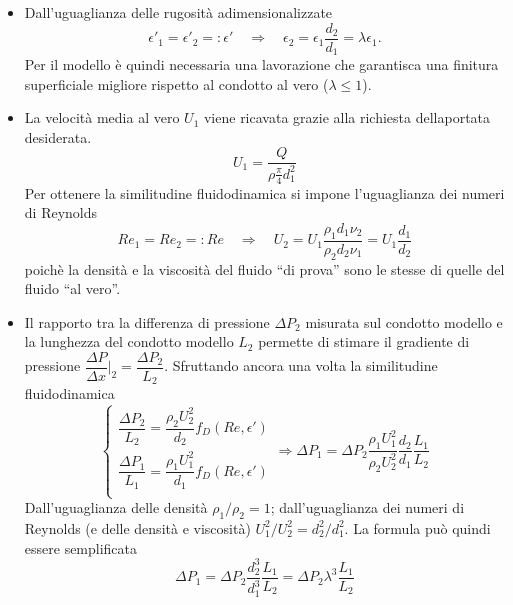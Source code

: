  \begin{itemize}
  \item Dall'uguaglianza delle rugosità adimensionalizzate
    \begin{equation}
      \epsilon'_1 = \epsilon'_2=:\epsilon' \quad \Rightarrow \quad \epsilon_2 = \epsilon_1 \dfrac{d_2}{d_1} = \lambda \epsilon_1.
    \end{equation}
    Per il modello è quindi necessaria una lavorazione che garantisca una
     finitura superficiale migliore rispetto al condotto al vero
     ($\lambda \le 1$).
  \item La velocità media al vero $U_1$ viene ricavata grazie alla richiesta
   dellaportata desiderata.
     \begin{equation}
       U_1 = \dfrac{Q}{\rho \frac{\pi}{4} d_1^2}
     \end{equation}
     Per ottenere la similitudine fluidodinamica si impone l'uguaglianza
     dei numeri di Reynolds
     \begin{equation}
      Re_1 = Re_2=:Re \quad \Rightarrow \quad U_2 = U_1
       \dfrac{\rho_1 d_1 \nu_2}{\rho_2 d_2 \nu_1} = U_1 \dfrac{d_1}{d_2}
     \end{equation}
     poichè la densità e la viscosità del fluido ``di prova'' sono le stesse
     di quelle del fluido ``al vero''.
  \item Il rapporto tra la differenza di pressione $\Delta P_2$ misurata sul
   condotto modello e la lunghezza del condotto modello $L_2$ permette di
   stimare il gradiente di pressione $\dfrac{\Delta P}{\Delta x}\Big|_2 =
   \dfrac{\Delta P_2}{L_2}$.
   Sfruttando ancora una volta la similitudine fluidodinamica
   \begin{equation}
   \begin{cases}
    \dfrac{\Delta P_2}{L_2} = \dfrac{\rho_2 U_2^2}{d_2} f_D(Re,\epsilon') \\
    \dfrac{\Delta P_1}{L_1} = \dfrac{\rho_1 U_1^2}{d_1} f_D(Re,\epsilon') \\
   \end{cases}
    \Rightarrow \Delta P_1 = \Delta P_2 \dfrac{\rho_1 U_1^2}{\rho_2 U_2^2}
     \dfrac{d_2}{d_1} \dfrac{L_1}{L_2}
   \end{equation}
   Dall'uguaglianza delle densità $\rho_1/\rho_2 = 1$; dall'uguaglianza dei
   numeri di Reynolds (e delle densità e viscosità) $	U_1^2/U_2^2 =
   d_2^2/d_1^2$. La formula può quindi essere semplificata
   \begin{equation}
     \Delta P_1 = \Delta P_2 \dfrac{d^3_2}{d^3_1} \dfrac{L_1}{L_2} =
                  \Delta P_2 \lambda^3 \dfrac{L_1}{L_2}
   \end{equation}
 \end{itemize}

